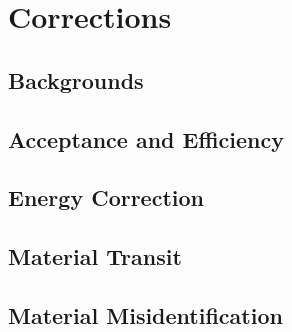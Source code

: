 \section{\deltaray Corrections}
\label{sec:corr}
\subsection{Backgrounds}
\subsection{Acceptance and Efficiency}
\subsection{Energy Correction}
\subsection{Material Transit}
\subsection{Material Misidentification}
